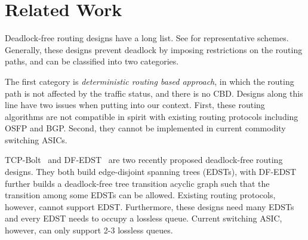 \section{Related Work}\label{sec:related}




Deadlock-free routing designs have a long list. See
\cite{dally,duato93,dally93,sancho2004,flich2012survey,lash,wu2003fault,glass,duato2001,domke2011,puente1999,dfedst16}
for representative schemes. Generally, these designs prevent deadlock
by imposing restrictions on the routing paths, and can be classified
into two categories.

The first category is {\em deterministic routing based approach}, in
which the routing path is not affected by the traffic status, and there
is no CBD.
Designs along this line have two issues when putting into our context.
First, these routing algorithms are not compatible in spirit with
existing routing protocols including OSFP and BGP. Second, they cannot
be implemented in current commodity switching ASICs.

TCP-Bolt~\cite{tcpbolt} and DF-EDST~\cite{dfedst16} are two recently
proposed deadlock-free routing designs. They both build edge-disjoint
spanning trees (EDSTs), with DF-EDST~\cite{dfedst16} further builds a
deadlock-free tree transition acyclic graph such that the transition
among some EDSTs can be allowed. Existing routing protocols, however,
cannot support EDST. Furthermore, these designs need many EDSTs and
every EDST needs to occupy a lossless queue. Current switching ASIC,
however, can only support 2-3 lossless queues.

